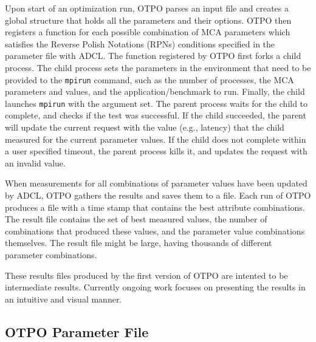 
Upon start of an optimization run, OTPO parses an input file %
and creates a global structure that holds all the
parameters and their options. OTPO then registers a function for each possible combination of MCA parameters which satisfies the Reverse Polish Notations (RPNs) conditions specified in the parameter file with ADCL. The function registered by OTPO first forks a child process. The child process sets the parameters in the environment that need to be provided to the {\tt mpirun} command, such as the number of processes, the MCA parameters and values, and the   application/benchmark to run. Finally, the child launches {\tt mpirun} with the argument set. The parent process waits for the child to complete, and checks if the test was successful. %
If the child succeeded, the parent will update the current request with the value (e.g., latency) that the child measured for the current parameter values. If the child does not complete within a user specified timeout, the parent process kills it, and updates the request with an invalid value.

When measurements for all combinations of parameter values have been
updated by ADCL, OTPO gathers the results and saves
them to a file. Each run of OTPO produces a file with a time stamp
that contains the best attribute combinations. The result file
contains the set of best measured values, the number of combinations
that produced these values, and the parameter value combinations
themselves. The result file might be large, having thousands of
different parameter combinations.

These results files produced by the first version of OTPO are intented
to be intermediate results.  Currently ongoing work focuses on presenting the
results in an intuitive and visual manner.


\subsection{OTPO Parameter File}

